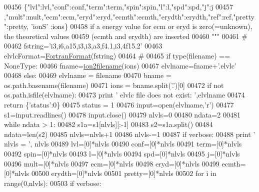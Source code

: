 \begin{DoxyCode}
{{{{{00456 \textcolor{stringliteral}{    \{"lvl":lvl,"conf":conf,"term":term,"spin":spin,"l":l,"spd":spd,"j":j}
00457 \textcolor{stringliteral}{    ,"mult":mult,"ecm":ecm,"eryd":eryd,"ecmth":ecmth,"erydth":erydth,"ref":ref,"pretty":pretty, 'ionS'
      :ions\}}
00458 \textcolor{stringliteral}{    if a energy value for ecm or eryd is zero(=unknown), the theoretical values}
00459 \textcolor{stringliteral}{    (ecmth and erydth) are inserted}
00460 \textcolor{stringliteral}{    """}
00461     \textcolor{comment}{#}
00462     fstring=\textcolor{stringliteral}{'i3,i6,a15,i3,i3,a3,f4.1,i3,4f15.2'}
00463     elvlcFormat=\hyperlink{classpyneb_1_1utils_1_1_fortran_format_1_1_fortran_format}{FortranFormat}(fstring)
00464     \textcolor{comment}{#}
00465     \textcolor{keywordflow}{if} type(filename) == NoneType:
00466         fname=\hyperlink{namespacepyneb_1_1utils_1_1__chianti__tools_ad4bc7b577fd4c3819ceb00b0a444351b}{ion2filename}(ions)
00467         elvlname=fname+\textcolor{stringliteral}{'.elvlc'}
00468     \textcolor{keywordflow}{else}:
00469         elvlname = filename
00470         bname = os.path.basename(filename)
00471         ions = bname.split(\textcolor{stringliteral}{'.'})[0]
00472     \textcolor{keywordflow}{if} \textcolor{keywordflow}{not} os.path.isfile(elvlname):
00473         \textcolor{keywordflow}{print} \textcolor{stringliteral}{' elvlc file does not exist:  '},elvlname
00474         \textcolor{keywordflow}{return} \{\textcolor{stringliteral}{'status'}:0\}
00475     status = 1
00476     input=open(elvlname,\textcolor{stringliteral}{'}\textcolor{stringliteral}{r')}
00477 \textcolor{stringliteral}{    s1=input.readlines()}
00478 \textcolor{stringliteral}{    input.close()}
00479 \textcolor{stringliteral}{    nlvls=0}
00480 \textcolor{stringliteral}{    ndata=2}
00481 \textcolor{stringliteral}{    }\textcolor{keywordflow}{while} ndata > 1:
00482         s1a=s1[nlvls][:-1]
00483         s2=s1a.split()
00484         ndata=len(s2)
00485         nlvls=nlvls+1
00486     nlvls-=1
00487     \textcolor{keywordflow}{if} verbose:
00488         \textcolor{keywordflow}{print} \textcolor{stringliteral}{' nlvls = '}, nlvls
00489     lvl=[0]*nlvls
00490     conf=[0]*nlvls
00491     term=[0]*nlvls
00492     spin=[0]*nlvls
00493     l=[0]*nlvls
00494     spd=[0]*nlvls
00495     j=[0]*nlvls
00496     mult=[0]*nlvls
00497     ecm=[0]*nlvls
00498     eryd=[0]*nlvls
00499     ecmth=[0]*nlvls
00500     erydth=[0]*nlvls
00501     pretty=[0]*nlvls
00502     \textcolor{keywordflow}{for} i \textcolor{keywordflow}{in} range(0,nlvls):
00503         \textcolor{keywordflow}{if} verbose:
}}}}}
\end{DoxyCode}
